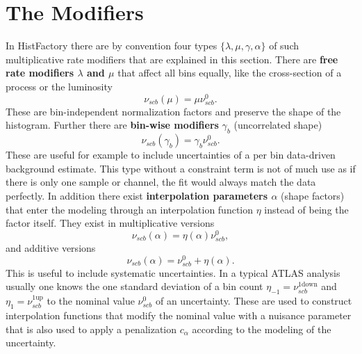 \section{The Modifiers}\label{sec:modifiers}
In HistFactory there are by convention four types $\{\lambda,\mu,\gamma,\alpha\}$ of such multiplicative rate modifiers that are explained in this section. There are \textbf{free rate modifiers $\lambda$ and $\mu$} that affect all bins equally, like the cross-section of a process or the luminosity 
\begin{equation}
    \nu_{scb}(\mu)=\mu \nu_{scb}^0.
\end{equation}
These are bin-independent normalization factors and preserve the shape of the histogram. 
Further there are \textbf{bin-wise modifiers} $\gamma_b$ (uncorrelated shape)
\begin{equation}
    \nu_{scb}(\gamma_b)=\gamma_b \nu_{scb}^0.
\end{equation}
These are useful for example to include uncertainties of a per bin data-driven background estimate. This type without a constraint term is not of much use as if there is only one sample or channel, the fit would always match the data perfectly.
In addition there exist \textbf{interpolation parameters $\alpha$} (shape factors) that enter the modeling through an interpolation function $\eta$ instead of being the factor itself. They exist in multiplicative versions 
\begin{equation}
    \nu_{scb}(\alpha)=\eta(\alpha) \nu_{scb}^0,
\end{equation}
and additive versions
\begin{equation}
    \nu_{scb}(\alpha)=\nu_{scb}^0 + \eta(\alpha).
\end{equation}
This is useful to include systematic uncertainties. In a typical ATLAS analysis usually one knows the one standard deviation of a bin count $\eta_{-1}=\nu_{scb}^\mathrm{1down}$ and $\eta_{1}=\nu_{scb}^\mathrm{1up}$ to the nominal value $\nu_{scb}^0$ of an uncertainty. These are used to construct interpolation functions that modify the nominal value with a nuisance parameter that is also used to apply a penalization $c_\alpha$ according to the modeling of the uncertainty.

